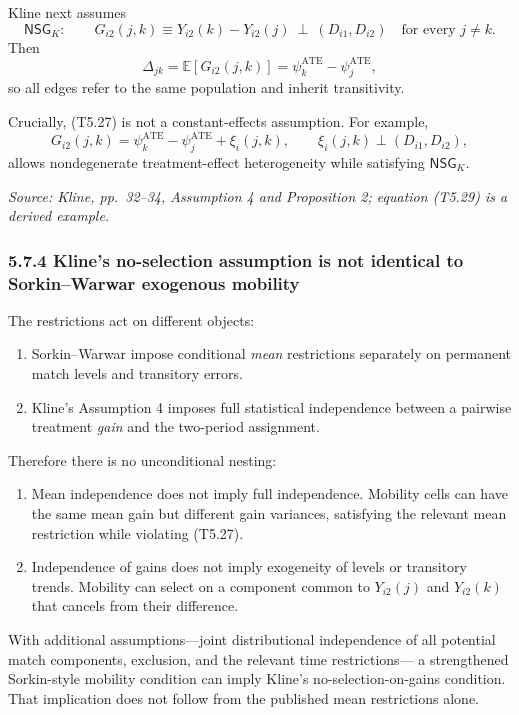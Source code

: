 \documentclass[11pt]{article}
\begin{document}
Kline next assumes
\[
\mathsf{NSG}_{K}:
\qquad
G_{i2}(j,k)
\equiv
Y_{i2}(k)-Y_{i2}(j)
\ \perp\
(D_{i1},D_{i2})
\quad
\text{for every }j\neq k.
\tag{T5.27}
\]
Then
\[
\Delta_{jk}
=
\mathbb E[G_{i2}(j,k)]
=
\psi_k^{\mathrm{ATE}}-\psi_j^{\mathrm{ATE}},
\tag{T5.28}
\]
so all edges refer to the same population and inherit transitivity.

Crucially, (T5.27) is not a constant-effects assumption.  For example,
\[
G_{i2}(j,k)
=
\psi_k^{\mathrm{ATE}}-\psi_j^{\mathrm{ATE}}+\xi_i(j,k),
\qquad
\xi_i(j,k)\perp(D_{i1},D_{i2}),
\tag{T5.29}
\]
allows nondegenerate treatment-effect heterogeneity while satisfying
\(\mathsf{NSG}_{K}\).

\textit{Source: Kline, pp.\ 32--34, Assumption 4 and Proposition 2;
equation (T5.29) is a derived example.}

\subsubsection{5.7.4 Kline's no-selection assumption is not identical to
Sorkin--Warwar exogenous mobility}

The restrictions act on different objects:

\begin{enumerate}
\item Sorkin--Warwar impose conditional \emph{mean} restrictions separately
  on permanent match levels and transitory errors.
\item Kline's Assumption 4 imposes full statistical independence between a
  pairwise treatment \emph{gain} and the two-period assignment.
\end{enumerate}

Therefore there is no unconditional nesting:

\begin{enumerate}
\item Mean independence does not imply full independence.  Mobility cells
  can have the same mean gain but different gain variances, satisfying the
  relevant mean restriction while violating (T5.27).
\item Independence of gains does not imply exogeneity of levels or
  transitory trends.  Mobility can select on a component common to
  \(Y_{i2}(j)\) and \(Y_{i2}(k)\) that cancels from their difference.
\end{enumerate}

With additional assumptions---joint distributional independence of all
potential match components, exclusion, and the relevant time restrictions---
a strengthened Sorkin-style mobility condition can imply Kline's
no-selection-on-gains condition.  That implication does not follow from the
published mean restrictions alone.
\end{document}
